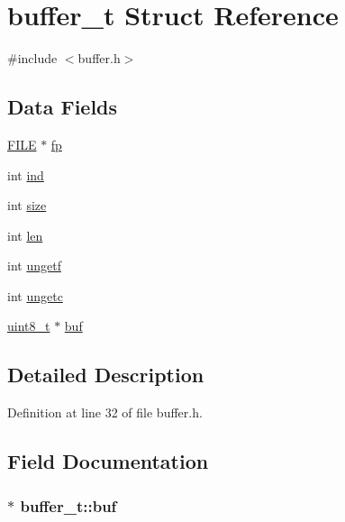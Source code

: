 \hypertarget{structbuffer__t}{}\section{buffer\+\_\+t Struct Reference}
\label{structbuffer__t}


{\ttfamily \#include $<$buffer.\+h$>$}

\subsection*{Data Fields}
\begin{DoxyCompactItemize}
\item 
\hyperlink{posix_8h_aed4dabeb9f7c518ded42f930a04abce8}{F\+I\+LE} $\ast$ \hyperlink{structbuffer__t_a00a55014e0827223c41b1b1d56e5be5d}{fp}
\item 
int \hyperlink{structbuffer__t_a59ea992e5006ead050862bae5c41670a}{ind}
\item 
int \hyperlink{structbuffer__t_a34e81d898c6accf4f06ed9c1133d6361}{size}
\item 
int \hyperlink{structbuffer__t_a0b67fc6880d331ae05dab0e58a4584c2}{len}
\item 
int \hyperlink{structbuffer__t_a67c2edddeca1858c670ff57e049a9e0e}{ungetf}
\item 
int \hyperlink{structbuffer__t_aa1fbbf42ce5d6278b21a93647bef3ff1}{ungetc}
\item 
\hyperlink{send_8c_aba7bc1797add20fe3efdf37ced1182c5}{uint8\+\_\+t} $\ast$ \hyperlink{structbuffer__t_ab98e4f2d4fe10a680089d291ef1907c7}{buf}
\end{DoxyCompactItemize}


\subsection{Detailed Description}


Definition at line 32 of file buffer.\+h.



\subsection{Field Documentation}
\subsubsection[{\texorpdfstring{buf}{buf}}]{$\ast$ buffer\+\_\+t\+::buf}\hypertarget{structbuffer__t_ab98e4f2d4fe10a680089d291ef1907c7}{}\label{structbuffer__t_ab98e4f2d4fe10a680089d291ef1907c7}


